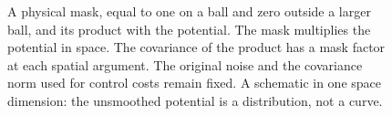 \begin{figure}[htbp]
  \centering
  
  \caption[A physical mask as a window on the potential]{A physical mask,
    equal to one on a ball and zero outside a larger ball, and its product
    with the potential. The mask multiplies the potential in space. The
    covariance of the product has a mask factor at each spatial argument. The
    original noise and the covariance norm used for control costs remain
    fixed. A schematic in one space dimension: the unsmoothed potential is a
    distribution, not a curve.}
  \label{Fig:mask-window}
\end{figure}
